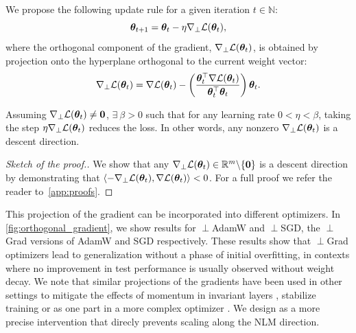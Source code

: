 \begin{dfn}
    We propose the following update rule for a given iteration $t \in \mathbb{N}$: 
    \begin{equation}
        \bm{\theta}_{t+1} = \bm{\theta}_t - \eta \nabla_{\perp} \mathcal{L}(\bm{\theta}_t),
    \end{equation}
    where the orthogonal component 
 of the gradient, $\nabla_{\perp} \mathcal{L}(\bm{\theta}_t)$, is obtained by projection onto the hyperplane orthogonal to the current weight vector: 
 \begin{equation}
     \nabla_{\perp} \mathcal{L}(\bm{\theta}_t) = \nabla \mathcal{L}(\bm{\theta}_t) - \left( \frac{\bm{\theta}_t^\top \nabla \mathcal{L}(\bm{\theta}_t)}{\bm{\theta}_t^\top \bm{\theta}_t} \right) \bm{\theta}_t.
 \end{equation}
\end{dfn}
\begin{prop}\label{prop:NLMGrad}
    Assuming $\nabla_{\perp} \mathcal{L}(\bm{\theta}_t)\neq \mathbf{0}$, $\exists~\beta>0$ such
that for any learning rate $0 <\eta<\beta$, taking the step $\eta\nabla_{\perp} \mathcal{L}(\bm{\theta}_t)$ reduces the loss. In other words, any nonzero $\nabla_{\perp} \mathcal{L}(\bm{\theta}_t)$ is a descent direction.
\end{prop}
\vspace{-7pt}
\begin{proof}[Sketch of the proof.]
We show that any $\nabla_{\perp} \mathcal{L}(\bm{\theta}_t) \in \mathbb{R}^m\backslash\{\mathbf{0}\}$ is a descent direction by demonstrating that $\left\langle -\nabla_{\perp} \mathcal{L}(\bm{\theta}_t), \nabla\mathcal{L}(\bm{\theta}_t) \right\rangle < 0$. For a full proof we refer the reader to~\cref{app:proofs}.
\end{proof}

This projection of the gradient can be incorporated into different optimizers. In \cref{fig:orthogonal_gradient}, we show results for $\perp$AdamW and $\perp$SGD, the $\perp$Grad versions of AdamW and SGD respectively. These results show that $\perp$Grad optimizers lead to generalization without a phase of initial overfitting, in contexts where no improvement in test performance is usually observed without weight decay. We note that similar projections of the gradients have been used in other settings to mitigate the effects of momentum in invariant layers \citep{adamp2020}, stabilize training \cite{wang2024achieving} or as one part in a more complex optimizer \citep{kosson2024rotational}. We design \ograd as a more precise intervention that direcly prevents scaling along the NLM direction.

